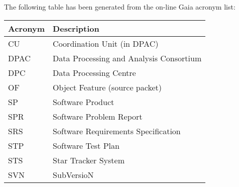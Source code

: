 The following table has been generated from the on-line Gaia acronym list:
\newline\newline%
\addtocounter{table}{-1}
\begin{longtable}{|l|p{}|}\hline 
\textbf{Acronym} & \textbf{Description}  \\\hline
CU&Coordination Unit (in DPAC) \\\hline
DPAC&Data Processing and Analysis Consortium \\\hline
DPC&Data Processing Centre \\\hline
OF&Object Feature (source packet) \\\hline
SP&Software Product \\\hline
SPR&Software Problem Report \\\hline
SRS&Software Requirements Specification \\\hline
STP&Software Test Plan \\\hline
STS&Star Tracker System \\\hline
SVN&SubVersioN \\\hline
\end{longtable} 
